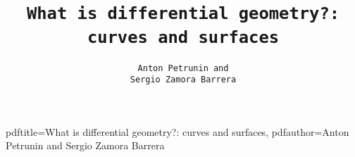 \hypersetup
{
pdftitle={What is differential geometry?: curves and surfaces},
pdfauthor={Anton Petrunin and Sergio Zamora Barrera}
}

\title{\tt What is differential geometry?:\\
curves and surfaces}

\author{\tt Anton Petrunin and \\ \tt Sergio Zamora Barrera}

\date{}

\maketitle

\thispagestyle{empty}
